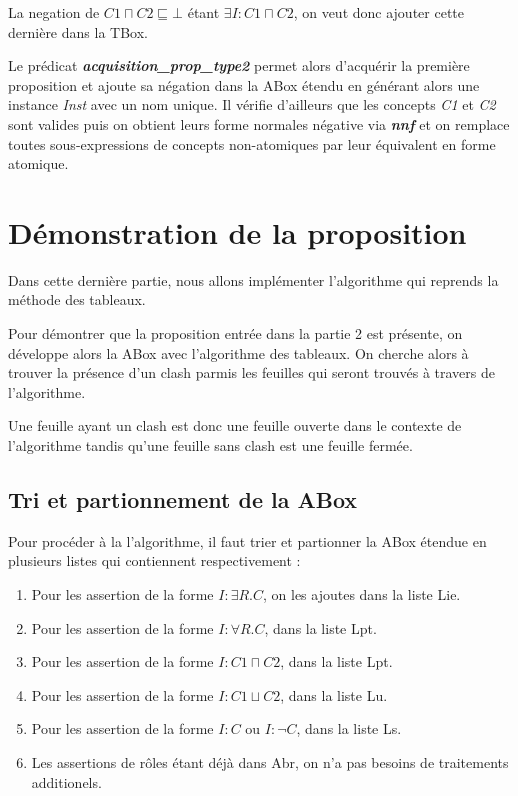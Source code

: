 \documentclass{rapportECL}
\begin{document}
La negation de \textit{\(C1 \sqcap C2 \sqsubseteq \bot\)} étant \textit{\(\exists I : C1 \sqcap C2\)}, on veut donc ajouter cette dernière dans la TBox.

Le prédicat \textbf{\textit{acquisition\_prop\_type2}} permet alors d'acquérir la première proposition et ajoute sa négation dans la ABox étendu en générant alors une instance \textit{Inst} avec un nom unique. Il vérifie d'ailleurs que les concepts \textit{C1} et \textit{C2} sont valides puis on obtient leurs forme normales négative via \textbf{\textit{nnf}} et on remplace toutes sous-expressions de concepts non-atomiques par leur équivalent en forme atomique.

\newpage

\section{Démonstration de la proposition}

Dans cette dernière partie, nous allons implémenter l'algorithme qui reprends la méthode des tableaux.

Pour démontrer que la proposition entrée dans la partie 2 est présente, on développe alors la ABox avec l'algorithme des tableaux. On cherche alors à trouver la présence d'un clash parmis les feuilles qui seront trouvés à travers de l'algorithme.

Une feuille ayant un clash est donc une feuille ouverte dans le contexte de l'algorithme tandis qu'une feuille sans clash est une feuille fermée.

\subsection{Tri et partionnement de la ABox}

Pour procéder à la l'algorithme, il faut trier et partionner la ABox étendue en plusieurs listes qui contiennent respectivement :

\begin{enumerate}[label=-]
    \item  Pour les assertion de la forme \textit{\(I : \exists R.C\)}, on les ajoutes dans la liste Lie.
    \item  Pour les assertion de la forme \textit{\(I : \forall R.C\)}, dans la liste Lpt.
    \item  Pour les assertion de la forme \textit{\(I : C1 \sqcap C2 \)}, dans la liste Lpt.
    \item  Pour les assertion de la forme \textit{\(I : C1 \sqcup C2 \)}, dans la liste Lu.
    \item  Pour les assertion de la forme \textit{\(I : C \)} ou \textit{\(I : \neg C \)}, dans la liste Ls.
    \item  Les assertions de rôles étant déjà dans Abr, on n'a pas besoins de traitements additionels.
\end{enumerate}
\end{document}
